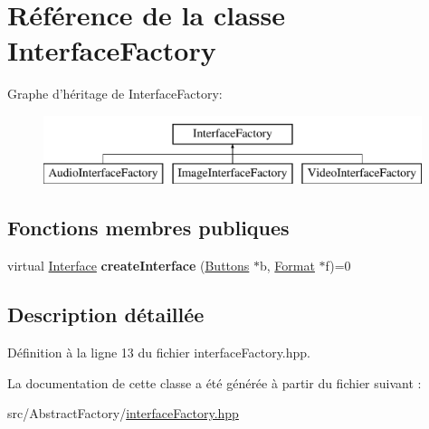 \hypertarget{classInterfaceFactory}{\section{Référence de la classe Interface\+Factory}
\label{classInterfaceFactory}
}
Graphe d'héritage de Interface\+Factory\+:\begin{figure}[H]
\begin{center}
\leavevmode
\includegraphics[height=2.000000cm]{classInterfaceFactory}
\end{center}
\end{figure}
\subsection*{Fonctions membres publiques}
\begin{DoxyCompactItemize}
\item 
\hypertarget{classInterfaceFactory_a043c593647071e277c897a5416221de0}{virtual \hyperlink{classInterface}{Interface} {\bfseries create\+Interface} (\hyperlink{classButtons}{Buttons} $\ast$b, \hyperlink{classFormat}{Format} $\ast$f)=0}\label{classInterfaceFactory_a043c593647071e277c897a5416221de0}

\end{DoxyCompactItemize}


\subsection{Description détaillée}


Définition à la ligne 13 du fichier interface\+Factory.\+hpp.



La documentation de cette classe a été générée à partir du fichier suivant \+:\begin{DoxyCompactItemize}
\item 
src/\+Abstract\+Factory/\hyperlink{interfaceFactory_8hpp}{interface\+Factory.\+hpp}\end{DoxyCompactItemize}
